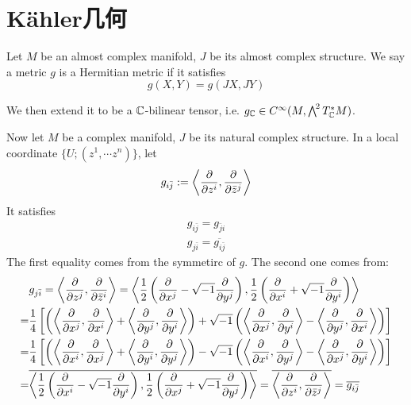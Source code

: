    \section{K\"ahler几何}
    \begin{definition}
        Let $M$ be an almost complex manifold, $J$ be its almost complex structure. We say a metric $g$ is a Hermitian metric if it satisfies
        \[
            g(X,Y)=g(JX,JY)
        \]
    \end{definition}
    We then extend it to be a $\mathbb{C}$-bilinear tensor, i.e. $g_{\mathbb{C}}\in C^{\infty}(M,\bigwedge^{\!2}T^*_{\mathbb{C}}M)$. 

    Now let $M$ be a complex manifold, $J$ be its natural complex structure. In a local coordinate $\{U;(z^1,\cdots z^n)\}$, let
    \[
        g_{i\bar{j}}:=\left\langle \frac{\partial }{\partial z^i},\frac{\partial }{\partial \bar{z}^j}\right\rangle 
    \]
    It satisfies
    \begin{gather*}
        g_{i\bar{j}}=g_{\bar{j}i} \\
        g_{j\bar{i}}=\overline{g_{i\bar{j}}}
    \end{gather*}
    The first equality comes from the symmetirc of $g$. The second one comes from:
    \begin{align*}
    &g_{j\bar{i}} = \left\langle\frac{\partial }{\partial z^j},\frac{\partial }{\partial \bar{z}^i}\right\rangle = \left\langle\frac{1}{2}\left(\frac{\partial }{\partial x^j}-\sqrt{-1}\frac{\partial }{\partial y^j}\right), \frac{1}{2}\left(\frac{\partial }{\partial x^i}+\sqrt{-1}\frac{\partial }{\partial y^i}\right)\right\rangle \\
    =& \frac{1}{4} \left[\left(\left\langle\frac{\partial }{\partial x^j},\frac{\partial }{\partial x^i}\right\rangle+\left\langle\frac{\partial }{\partial y^j},\frac{\partial }{\partial y^i}\right\rangle\right)+\sqrt{-1}\left(\left\langle\frac{\partial }{\partial x^j},\frac{\partial }{\partial y^i}\right\rangle-\left\langle\frac{\partial }{\partial y^j},\frac{\partial }{\partial x^i}\right\rangle\right)\right] \\
    =& \frac{1}{4} \left[\left(\left\langle\frac{\partial }{\partial x^i},\frac{\partial }{\partial x^j}\right\rangle+\left\langle\frac{\partial }{\partial y^i},\frac{\partial }{\partial y^j}\right\rangle\right)-\sqrt{-1}\left(\left\langle\frac{\partial }{\partial x^i},\frac{\partial }{\partial y^j}\right\rangle-\left\langle\frac{\partial }{\partial x^j},\frac{\partial }{\partial y^i}\right\rangle\right)\right] \\
    =& \overline{\left\langle\frac{1}{2}\left(\frac{\partial }{\partial x^i}-\sqrt{-1}\frac{\partial }{\partial y^i}\right), \frac{1}{2}\left(\frac{\partial }{\partial x^j}+\sqrt{-1}\frac{\partial }{\partial y^j}\right)\right\rangle} = \overline{\left\langle\frac{\partial }{\partial z^i},\frac{\partial }{\partial \bar{z}^j}\right\rangle} = \overline{g_{i\bar{j}}}
    \end{align*}
